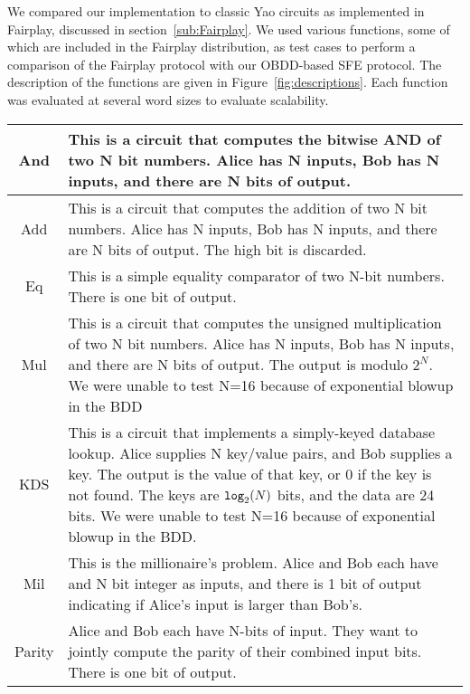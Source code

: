 We compared our implementation to classic Yao circuits as implemented in
Fairplay, discussed in section~\ref{sub:Fairplay}.
We used various functions, some of which are included in the Fairplay
distribution, as test
cases to perform a comparison of the Fairplay protocol with our
OBDD-based SFE protocol. The description of the functions are given
in Figure~\ref{fig:descriptions}.  Each function was evaluated
at several word sizes to evaluate scalability.

\begin{figure*}
\begin{tabular}{|c|p{6in}|}
\hline 
And&
This is a circuit that computes the bitwise AND of two N bit numbers.
Alice has N inputs, Bob has N inputs, and there are N bits of output.\tabularnewline
\hline 
Add&
This is a circuit that computes the addition of two N bit numbers.
Alice has N inputs, Bob has N inputs, and there are N bits of output.
The high bit is discarded.\tabularnewline
\hline 
Eq&
This is a simple equality comparator of two N-bit numbers.  There is
one bit of output. \tabularnewline
\hline
Mul&
This is a circuit that computes the unsigned multiplication of two
N bit numbers. Alice has N inputs, Bob has N inputs, and there are
N bits of output. The output is modulo $2^N$.  
We were unable to test N=16 because of exponential blowup in the BDD
\tabularnewline
\hline 
KDS&
This is a circuit that implements a simply-keyed database lookup.
Alice supplies N key/value pairs, and Bob supplies a key. The output
is the value of that key, or 0 if the key is not found. The keys are
${\tt log}_2(N)$ bits, and the data are 24 bits. 
We were unable to test N=16 because of exponential blowup in the BDD.
\tabularnewline
\hline 
Mil&
This is the millionaire's problem. Alice and Bob each have and N bit integer
as inputs, and there is 1 bit of output indicating if Alice's input is larger than Bob's.\tabularnewline
\hline 
Parity&
Alice and Bob each have N-bits of input. They want to jointly compute the
parity of their combined input bits.  There is one bit of output.\tabularnewline
\hline
\end{tabular}
\caption{Description of the functions used in our experiments.  Each function
was tested with N=4, N=8, and N=16 except where indicated}
\label{fig:descriptions}
\end{figure*}


